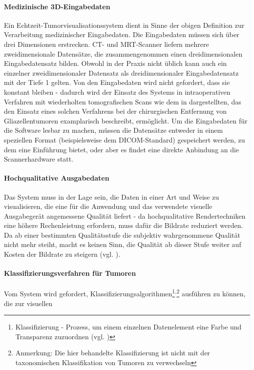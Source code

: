 \documentclass[a4paper,titlepage,12pt]{scrartcl}
\newtheorem[L]{boxedDefinition}{Definition}
\begin{document}
\paragraph{Medizinische 3D-Eingabedaten} Ein Echtzeit-Tumorvisualisationssystem dient in Sinne der obigen Definition zur Verarbeitung medizinischer Eingabedaten. Die Eingabedaten müssen sich über drei Dimensionen erstrecken. CT- und MRT-Scanner liefern mehrere zweidimensionale Datensätze, die zusammengenommen einen dreidimensionalen Eingabedatensatz bilden. Obwohl in der Praxis nicht üblich kann auch ein einzelner zweidimensionaler Datensatz als dreidimensionaler Eingabedatensatz mit der Tiefe 1 gelten.  Von den Eingabedaten wird nicht gefordert, dass sie konstant bleiben - dadurch wird der Einsatz des Systems in intraoperativen Verfahren mit wiederholten tomografischen Scans wie dem in \cite{Okudera1994} dargestellten, das den Einsatz eines solchen Verfahrens bei der chirurgischen Entfernung von Gliazellentumoren examplarisch beschreibt, ermöglicht. Um die Eingabedaten für die Software lesbar zu machen, müssen die Datensätze entweder in einem speziellen Format (beispielsweise dem DICOM-Standard) gespeichert werden, zu dem \cite{Mildenberger2002} eine Einführung bietet, oder aber es findet eine direkte Anbindung an die Scannerhardware statt.

\paragraph{Hochqualitative Ausgabedaten} Das System muss in der Lage sein, die Daten in einer Art und Weise zu visualisieren, die eine für die Anwendung und das verwendete visuelle Ausgabegerät angemessene Qualität liefert - da hochqualitative Rendertechniken eine höhere Rechenleistung erfordern, muss dafür die Bildrate reduziert werden. Da ab einer bestimmten Qualitätsstufe die subjektiv wahrgenommene Qualität nicht mehr steiht, macht es keinen Sinn, die Qualität ab dieser Stufe weiter auf Kosten der Bildrate zu steigern (vgl. \cite[Kapitel 3.3, Seite 5]{Kutter2008}).

\paragraph{Klassifizierungsverfahren für Tumoren}Vom System wird gefordert, Klassifizierungsalgorithmen\footnote{Klassifizierung - Prozess, um einem einzelnen Datenelement eine Farbe und Transparenz zuzuordnen (vgl. \cite[Kapitel 3.2.2, Seite 28]{Bruckner2004})}\textsuperscript{,}\footnote{Anmerkung: Die hier behandelte Klassifizierung ist nicht mit der taxonomischen Klassifikation von Tumoren zu verwechseln} ausführen zu können, die zur visuellen 
\end{document}
